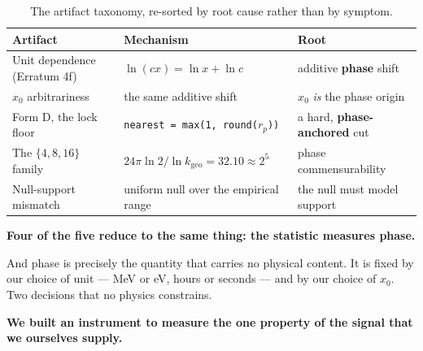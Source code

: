 \documentclass[11pt, letterpaper, openany]{book}
\newcommand{\kgeo}{k_{\mathrm{geo}}}
\begin{document}
\begin{table}[H]
\centering
\small
\begin{tabular}{@{}lp{}l@{}}
\toprule
\textbf{Artifact} & \textbf{Mechanism} & \textbf{Root} \\
\midrule
Unit dependence (Erratum 4f) & $\ln(cx) = \ln x + \ln c$ & additive \textbf{phase} shift \\
$x_0$ arbitrariness & the same additive shift & $x_0$ \emph{is} the phase origin \\
Form D, the lock floor & \texttt{nearest = max(1, round($r_p$))} & a hard, \textbf{phase-anchored} cut \\
The $\{4,8,16\}$ family & $24\pi \ln 2 / \ln \kgeo = 32.10 \approx 2^5$ & phase commensurability \\
Null-support mismatch & uniform null over the empirical range & the null must model support \\
\bottomrule
\end{tabular}
\caption{The artifact taxonomy, re-sorted by root cause rather than by symptom.}
\end{table}

\begin{warningbox}
\textbf{Four of the five reduce to the same thing: the statistic measures phase.}

\medskip
\noindent And phase is precisely the quantity that carries no physical content. It is fixed by
our choice of unit --- MeV or eV, hours or seconds --- and by our choice of $x_0$. Two decisions
that no physics constrains.

\medskip
\noindent \textbf{We built an instrument to measure the one property of the signal that we
ourselves supply.}
\end{warningbox}
\end{document}
